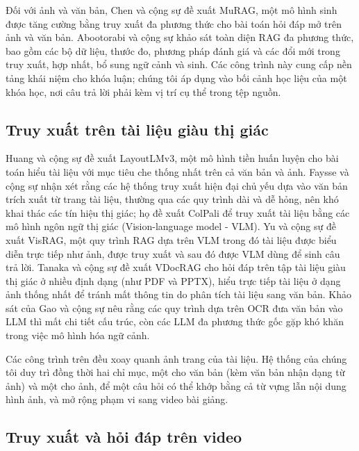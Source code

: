 \bigbreak\noindent
Đối với ảnh và văn bản, Chen và cộng sự \cite{chen2022murag} đề xuất MuRAG, một mô hình sinh được tăng cường bằng truy xuất đa phương thức cho bài toán hỏi đáp mở trên ảnh và văn bản. Abootorabi và cộng sự \cite{abootorabi2025ask} khảo sát toàn diện RAG đa phương thức, bao gồm các bộ dữ liệu, thước đo, phương pháp đánh giá và các đổi mới trong truy xuất, hợp nhất, bổ sung ngữ cảnh và sinh. Các công trình này cung cấp nền tảng khái niệm cho khóa luận; chúng tôi áp dụng vào bối cảnh học liệu của một khóa học, nơi câu trả lời phải kèm vị trí cụ thể trong tệp nguồn.

\subsection{Truy xuất trên tài liệu giàu thị giác}

Huang và cộng sự \cite{huang2022layoutlmv3} đề xuất LayoutLMv3, một mô hình tiền huấn luyện cho bài toán hiểu tài liệu với mục tiêu che thống nhất trên cả văn bản và ảnh. Faysse và cộng sự \cite{faysse2025colpali} nhận xét rằng các hệ thống truy xuất hiện đại chủ yếu dựa vào văn bản trích xuất từ trang tài liệu, thường qua các quy trình dài và dễ hỏng, nên khó khai thác các tín hiệu thị giác; họ đề xuất ColPali để truy xuất tài liệu bằng các mô hình ngôn ngữ thị giác (Vision-language model - VLM). Yu và cộng sự \cite{yu2025visrag} đề xuất VisRAG, một quy trình RAG dựa trên VLM trong đó tài liệu được biểu diễn trực tiếp như ảnh, được truy xuất và sau đó được VLM dùng để sinh câu trả lời. Tanaka và cộng sự \cite{tanaka2025vdocrag} đề xuất VDocRAG cho hỏi đáp trên tập tài liệu giàu thị giác ở nhiều định dạng (như PDF và PPTX), hiểu trực tiếp tài liệu ở dạng ảnh thống nhất để tránh mất thông tin do phân tích tài liệu sang văn bản. Khảo sát của Gao và cộng sự \cite{gao2026scaling} nêu rằng các quy trình dựa trên OCR đưa văn bản vào LLM thì mất chi tiết cấu trúc, còn các LLM đa phương thức gốc gặp khó khăn trong việc mô hình hóa ngữ cảnh.

\bigbreak\noindent
Các công trình trên đều xoay quanh ảnh trang của tài liệu. Hệ thống của chúng tôi duy trì đồng thời hai chỉ mục, một cho văn bản (kèm văn bản nhận dạng từ ảnh) và một cho ảnh, để một câu hỏi có thể khớp bằng cả từ vựng lẫn nội dung hình ảnh, và mở rộng phạm vi sang video bài giảng.

\subsection{Truy xuất và hỏi đáp trên video}

